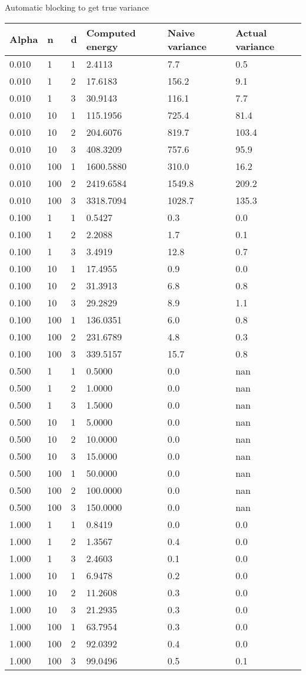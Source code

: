 \documentclass{article}
\begin{document}
\newpage
Automatic blocking to get true variance
\begin{longtable}[]{@{}llllll@{}}
\toprule
Alpha & n & d & Computed energy & Naive variance & Actual
variance\tabularnewline
\midrule
\endhead
0.010 & 1 & 1 & 2.4113 & 7.7 & 0.5\tabularnewline
0.010 & 1 & 2 & 17.6183 & 156.2 & 9.1\tabularnewline
0.010 & 1 & 3 & 30.9143 & 116.1 & 7.7\tabularnewline
0.010 & 10 & 1 & 115.1956 & 725.4 & 81.4\tabularnewline
0.010 & 10 & 2 & 204.6076 & 819.7 & 103.4\tabularnewline
0.010 & 10 & 3 & 408.3209 & 757.6 & 95.9\tabularnewline
0.010 & 100 & 1 & 1600.5880 & 310.0 & 16.2\tabularnewline
0.010 & 100 & 2 & 2419.6584 & 1549.8 & 209.2\tabularnewline
0.010 & 100 & 3 & 3318.7094 & 1028.7 & 135.3\tabularnewline
0.100 & 1 & 1 & 0.5427 & 0.3 & 0.0\tabularnewline
0.100 & 1 & 2 & 2.2088 & 1.7 & 0.1\tabularnewline
0.100 & 1 & 3 & 3.4919 & 12.8 & 0.7\tabularnewline
0.100 & 10 & 1 & 17.4955 & 0.9 & 0.0\tabularnewline
0.100 & 10 & 2 & 31.3913 & 6.8 & 0.8\tabularnewline
0.100 & 10 & 3 & 29.2829 & 8.9 & 1.1\tabularnewline
0.100 & 100 & 1 & 136.0351 & 6.0 & 0.8\tabularnewline
0.100 & 100 & 2 & 231.6789 & 4.8 & 0.3\tabularnewline
0.100 & 100 & 3 & 339.5157 & 15.7 & 0.8\tabularnewline
0.500 & 1 & 1 & 0.5000 & 0.0 & nan\tabularnewline
0.500 & 1 & 2 & 1.0000 & 0.0 & nan\tabularnewline
0.500 & 1 & 3 & 1.5000 & 0.0 & nan\tabularnewline
0.500 & 10 & 1 & 5.0000 & 0.0 & nan\tabularnewline
0.500 & 10 & 2 & 10.0000 & 0.0 & nan\tabularnewline
0.500 & 10 & 3 & 15.0000 & 0.0 & nan\tabularnewline
0.500 & 100 & 1 & 50.0000 & 0.0 & nan\tabularnewline
0.500 & 100 & 2 & 100.0000 & 0.0 & nan\tabularnewline
0.500 & 100 & 3 & 150.0000 & 0.0 & nan\tabularnewline
1.000 & 1 & 1 & 0.8419 & 0.0 & 0.0\tabularnewline
1.000 & 1 & 2 & 1.3567 & 0.4 & 0.0\tabularnewline
1.000 & 1 & 3 & 2.4603 & 0.1 & 0.0\tabularnewline
1.000 & 10 & 1 & 6.9478 & 0.2 & 0.0\tabularnewline
1.000 & 10 & 2 & 11.2608 & 0.3 & 0.0\tabularnewline
1.000 & 10 & 3 & 21.2935 & 0.3 & 0.0\tabularnewline
1.000 & 100 & 1 & 63.7954 & 0.3 & 0.0\tabularnewline
1.000 & 100 & 2 & 92.0392 & 0.4 & 0.0\tabularnewline
1.000 & 100 & 3 & 99.0496 & 0.5 & 0.1\tabularnewline
\bottomrule
\end{longtable}
\end{document}
